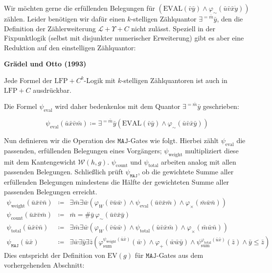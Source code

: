 Wir möchten gerne die erfüllenden Belegungen für $\left(\mathrm{EVAL}\left(\bar{v}\bar{y}\right)\wedge\varphi_{\sim}\left(\bar{u}\bar{v}\bar{x}\dot{y}\right)\right)$
zählen. Leider benötigen wir dafür einen $k$-stelligen Zählquantor
$\exists^{=\bar{m}}\bar{y}$, den die Definition der Zählerweiterung
$\mathcal{L}+\Upsilon+C$ nicht zulässt. Speziell in der Fixpunktlogik
(selbst mit disjunkter numerischer Erweiterung) gibt es aber eine
Reduktion auf den einstelligen Zählquantor:
\begin{prop}
\textbf{\label{prop:kary-counting}Grädel und Otto (1993)\cite{Gradel:1992:IDC:647842.736402}}

Jede Formel der $\mathrm{LFP}+C^{k}$-Logik mit $k$-stelligen Zählquantoren
ist auch in $\mathrm{LFP}+C$ ausdrückbar. 
\end{prop}
Die Formel $\psi_{\mathrm{eval}}$ wird daher bedenkenlos mit dem
Quantor $\exists^{=\bar{m}}\bar{y}$ geschrieben:

\[
\psi_{\mathrm{eval}}\left(\bar{u}\bar{x}\bar{v}\bar{m}\right)\coloneqq\exists^{=\bar{m}}\bar{y}\left(\mathrm{EVAL}\left(\bar{v}\bar{y}\right)\wedge\varphi_{\sim}\left(\bar{u}\bar{v}\bar{x}\bar{y}\right)\right)
\]

Nun definieren wir die Operation des $\mathtt{MAJ}$-Gates wie folgt.
Hierbei zählt $\psi_{\mathrm{eval}}$ die passenden, erfüllenden Belegungen
eines Vorgängers; $\psi_{\mathrm{weight}}$ multipliziert diese mit
dem Kantengewicht $\mathcal{W}\left(h,g\right)$. $\psi_{\mathrm{count}}$
und $\psi_{\mathrm{total}}$ arbeiten analog mit allen passenden Belegungen.
Schließlich prüft $\psi_{\mathtt{MAJ}}$, ob die gewichtete Summe
aller erfüllenden Belegungen mindestens die Hälfte der gewichteten
Summe aller passenden Belegungen erreicht. 
\begin{eqnarray*}
\psi_{\mathrm{weight}}\left(\bar{u}\bar{x}\bar{v}\bar{n}\right) & \coloneqq & \exists\bar{m}\exists\bar{w}\left(\varphi_{W}\left(\bar{v}\bar{u}\bar{w}\right)\wedge\psi_{\mathrm{eval}}\left(\bar{u}\bar{v}\bar{x}\bar{m}\right)\wedge\varphi_{\times}\left(\bar{m}\bar{w}\bar{n}\right)\right)\\
\psi_{\mathrm{count}}\left(\bar{u}\bar{x}\bar{v}\bar{m}\right) & \coloneqq & \bar{m}=\#\bar{y}\,\varphi_{\sim}\left(\bar{u}\bar{v}\bar{x}\bar{y}\right)\\
\psi_{\mathrm{total}}\left(\bar{u}\bar{x}\bar{v}\bar{n}\right) & \coloneqq & \exists\bar{m}\exists\bar{w}\left(\varphi_{W}\left(\bar{v}\bar{u}\bar{w}\right)\wedge\psi_{\mathrm{total}}\left(\bar{u}\bar{v}\bar{x}\bar{m}\right)\wedge\varphi_{\times}\left(\bar{m}\bar{w}\bar{n}\right)\right)\\
\psi_{\mathtt{MAJ}}\left(\bar{u}\bar{x}\right) & \coloneqq & \exists\bar{w}\exists\bar{y}\exists\bar{z}\left(\varphi_{\mathrm{sum}}^{\psi_{\mathrm{weight}}\left(\bar{u}\bar{x}\right)}\left(\bar{w}\right)\wedge\varphi_{+}\left(\bar{w}\bar{w}\bar{y}\right)\wedge\psi_{\mathrm{sum}}^{\varphi_{\mathrm{total}}\left(\bar{u}\bar{x}\right)}\left(\bar{z}\right)\wedge\bar{y}\leqslant\bar{z}\right)
\end{eqnarray*}
Dies entspricht der Definition von $\mathrm{EV}\left(g\right)$ für
$\mathtt{MAJ}$-Gates aus dem vorhergehenden Abschnitt:


